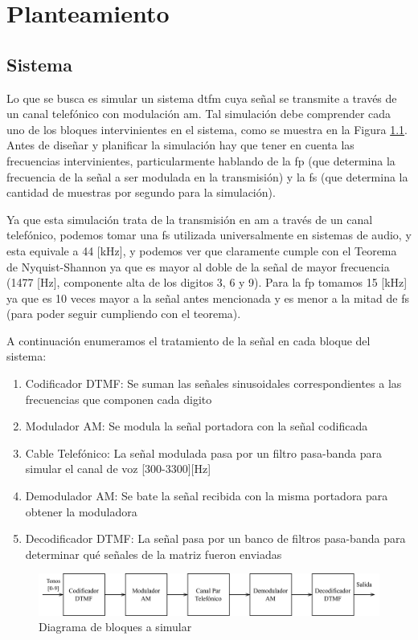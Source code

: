 \chapter{Planteamiento}
\section{Sistema}
Lo que se busca es simular un sistema \gls{dtfm} cuya señal se transmite a través de un canal telefónico con modulación \gls{am}. Tal simulación debe comprender cada uno de los bloques intervinientes en el sistema, como se muestra en la Figura \ref{fig:diagrama_bloques_objetivo}. Antes de diseñar y planificar la simulación hay que tener en cuenta las frecuencias intervinientes, particularmente hablando de la \gls{fp} (que determina la frecuencia de la señal a ser modulada en la transmisión) y la \gls{fs} (que determina la cantidad de muestras por segundo para la simulación).

Ya que esta simulación trata de la transmisión en \gls{am} a través de un canal telefónico, podemos tomar una \gls{fs} utilizada universalmente en sistemas de audio, y esta equivale a 44 [kHz], y podemos ver que claramente cumple con el Teorema de Nyquist-Shannon ya que es mayor al doble de la señal de mayor frecuencia (1477 [Hz], componente alta de los digitos 3, 6 y 9). Para la \gls{fp} tomamos 15 [kHz] ya que es 10 veces mayor a la señal antes mencionada y es menor a la mitad de \gls{fs} (para poder seguir cumpliendo con el teorema).

A continuación enumeramos el tratamiento de la señal en cada bloque del sistema:

\begin{enumerate}
  \item Codificador DTMF: Se suman las señales sinusoidales correspondientes a las frecuencias que componen cada digito
  \item Modulador AM: Se modula la señal portadora con la señal codificada
  \item Cable Telefónico: La señal modulada pasa por un filtro pasa-banda para simular el canal de voz [300-3300][Hz]
  \item Demodulador AM: Se bate la señal recibida con la misma portadora para obtener la moduladora
  \item Decodificador DTMF: La señal pasa por un banco de filtros pasa-banda para determinar qué señales de la matriz fueron enviadas
\end{enumerate}

\begin{figure}[H]
  \centering
  \includegraphics[width=\linewidth]{images/diagramas-bloques.png}
  \caption{Diagrama de bloques a simular}
  \label{fig:diagrama_bloques_objetivo}
\end{figure}

